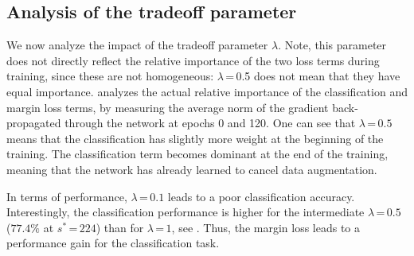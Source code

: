 \subsection{Analysis of the tradeoff parameter \label{sec:tradeoff-parameter}}

%
%
%
%
%
%
%
%

We now analyze the impact of the tradeoff parameter $\lambda$. 
Note, this parameter does not directly reflect the relative importance of the two loss terms during training, since these are not homogeneous: $\lambda$\,=\,0.5 does not mean that they have equal importance.  analyzes the actual relative importance of the classification and margin loss terms, by measuring the average norm of the gradient back-propagated through the network at epochs 0 and 120. One can see that $\lambda$\,=\,$0.5$ means that the classification has slightly more weight at the beginning of the training. The classification term becomes dominant at the end of the training, meaning that the network has already learned to cancel data augmentation. 

In terms of performance, $\lambda$\,=$\,0.1$ leads to a poor classification accuracy. 
Interestingly, the classification performance is higher for the intermediate $\lambda$\,=\,$0.5$ ($77.4\%$ at $s^*$\,=\,$224$) than for $\lambda$\,=\,$1$, see . 
Thus, the margin loss leads to a performance gain for the classification task. 
%

%
%

